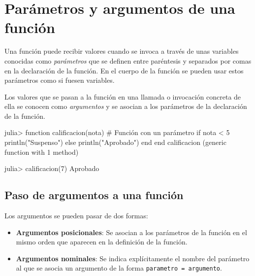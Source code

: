 \documentclass[
  letterpaper,
  DIV=11,
  numbers=noendperiod]{scrreprt}
\newenvironment{Shaded}{\begin{snugshade}}{\end{snugshade}}
\newcommand{\CommentTok}[1]{\textcolor[rgb]{0.37,0.37,0.37}{#1}}
\newcommand{\ControlFlowTok}[1]{\textcolor[rgb]{0.00,0.23,0.31}{#1}}
\newcommand{\FloatTok}[1]{\textcolor[rgb]{0.68,0.00,0.00}{#1}}
\newcommand{\FunctionTok}[1]{\textcolor[rgb]{0.28,0.35,0.67}{#1}}
\newcommand{\KeywordTok}[1]{\textcolor[rgb]{0.00,0.23,0.31}{#1}}
\newcommand{\NormalTok}[1]{\textcolor[rgb]{0.00,0.23,0.31}{#1}}
\newcommand{\OperatorTok}[1]{\textcolor[rgb]{0.37,0.37,0.37}{#1}}
\newcommand{\StringTok}[1]{\textcolor[rgb]{0.13,0.47,0.30}{#1}}
\providecommand{\tightlist}{%
  \setlength{\itemsep}{0pt}\setlength{\parskip}{0pt}}\usepackage{longtable,booktabs,array}
\begin{document}
\hypertarget{paruxe1metros-y-argumentos-de-una-funciuxf3n}{%
\section{Parámetros y argumentos de una
función}\label{paruxe1metros-y-argumentos-de-una-funciuxf3n}}

Una función puede recibir valores cuando se invoca a través de unas
variables conocidas como \emph{parámetros} que se definen entre
paréntesis y separados por comas en la declaración de la función. En el
cuerpo de la función se pueden usar estos parámetros como si fuesen
variables.

Los valores que se pasan a la función en una llamada o invocación
concreta de ella se conocen como \emph{argumentos} y se asocian a los
parámetros de la declaración de la función.

\begin{Shaded}
\begin{Highlighting}[]
\NormalTok{julia}\OperatorTok{\textgreater{}} \KeywordTok{function} \FunctionTok{calificacion}\NormalTok{(nota)  }\CommentTok{\# Función con un parámetro}
         \ControlFlowTok{if}\NormalTok{ nota }\OperatorTok{\textless{}} \FloatTok{5}
           \FunctionTok{println}\NormalTok{(}\StringTok{"Suspenso"}\NormalTok{)}
         \ControlFlowTok{else}
           \FunctionTok{println}\NormalTok{(}\StringTok{"Aprobado"}\NormalTok{)}
         \ControlFlowTok{end}
       \KeywordTok{end}
\NormalTok{calificacion (generic }\KeywordTok{function}\NormalTok{ with }\FloatTok{1}\NormalTok{ method)}

\NormalTok{julia}\OperatorTok{\textgreater{}} \FunctionTok{calificacion}\NormalTok{(}\FloatTok{7}\NormalTok{)}
\NormalTok{Aprobado}
\end{Highlighting}
\end{Shaded}

\hypertarget{paso-de-argumentos-a-una-funciuxf3n}{%
\subsection{Paso de argumentos a una
función}\label{paso-de-argumentos-a-una-funciuxf3n}}

Los argumentos se pueden pasar de dos formas:

\begin{itemize}
\tightlist
\item
  \textbf{Argumentos posicionales}: Se asocian a los parámetros de la
  función en el mismo orden que aparecen en la definición de la función.
\item
  \textbf{Argumentos nominales}: Se indica explícitamente el nombre del
  parámetro al que se asocia un argumento de la forma
  \texttt{parametro\ =\ argumento}.
\end{itemize}
\end{document}
